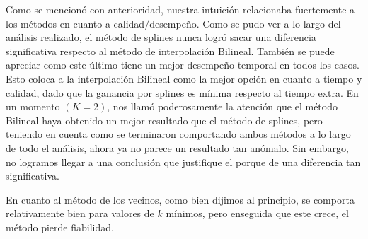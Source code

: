 Como se mencionó con anterioridad, nuestra intuición relacionaba fuertemente a los métodos en cuanto a calidad/desempeño.
Como se pudo ver a lo largo del análisis realizado, el método de splines nunca logró sacar una diferencia significativa respecto al método de interpolación Bilineal. También se puede apreciar como este último tiene un mejor desempeño temporal en todos los casos.
Esto coloca a la interpolación Bilineal como la mejor opción en cuanto a tiempo y calidad, dado que la ganancia por splines es mínima respecto al tiempo extra. En un momento $(K = 2)$, nos llamó poderosamente la atención que el método Bilineal haya obtenido un mejor resultado que el método de splines, pero teniendo en cuenta como se terminaron comportando ambos métodos a lo largo de todo el análisis, ahora ya no parece un resultado tan anómalo. Sin embargo, no logramos llegar a una conclusión que justifique el porque de una diferencia tan significativa.

En cuanto al método de los vecinos, como bien dijimos al principio, se comporta relativamente bien para valores de $k$ mínimos, pero enseguida que este crece, el método pierde fiabilidad.

